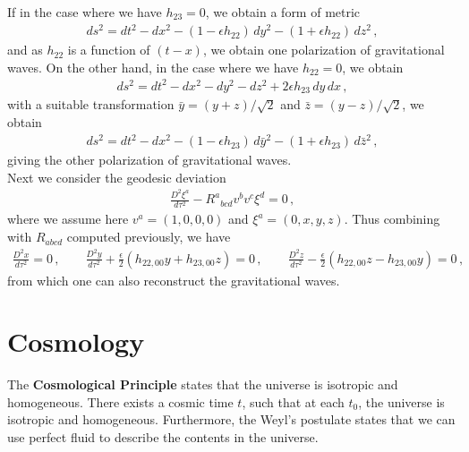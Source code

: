 \documentclass[11pt, onesided]{book}
\theoremstyle{break}
\theoremstyle{break}
\begin{document}
If in the case where we have $h_{23} = 0$, we obtain a form of metric
\begin{align*}
ds^2 = dt^2 - dx^2 - \left(1- \epsilon h_{22}\right)\, dy^2 - (1+\epsilon h_{22})\, dz^2\,,
\end{align*}
and as $h_{22}$ is a function of $(t-x)$, we obtain one polarization of gravitational waves. On the other hand, in the case where we have $h_{22} = 0$, we obtain
\begin{align*}
ds^2 = dt^2 - dx^2 - dy^2 - dz^2 + 2\epsilon h_{23}\, dy\, dx\,,
\end{align*}
with a suitable transformation $\bar{y} = (y+z)/\sqrt{2}$ and $\bar{z} = (y-z) /\sqrt{2}$, we obtain
\begin{align*}
ds^2 = dt^2 - dx^2 - (1-\epsilon h_{23}) \, d\bar{y}^2 - (1+\epsilon  h_{23})\, d\bar{z}^2\,,
\end{align*}
giving the other polarization of gravitational waves. \\

Next we consider the geodesic deviation
\begin{align*}
\frac{D^2 \xi^a}{d\tau^2} -
 R^a{}_{bcd}v^b v^c \xi^d = 0\,, 
\end{align*}
where we assume here $v^a = (1,0,0,0)$ and $\xi^a = (0,x,y,z)$. Thus combining with $R_{abcd}$ computed previously, we have 
\begin{align*}
\frac{D^2 x}{d\tau^2} = 0\,,\qquad
\frac{D^2 y}{d\tau^2} +\frac{\epsilon}{2}\left( h_{22,00}y + h_{23,00}z\right) = 0\,,\qquad
\frac{D^2 z}{d\tau^2} -\frac{\epsilon}{2}\left( h_{22,00}z - h_{23,00}y\right) = 0\,,
\end{align*}
from which one can also reconstruct the gravitational waves.\\

\section[Cosmology]{\color{red}Cosmology\color{black}}
The \textbf{Cosmological Principle} states that the universe is isotropic and homogeneous. There exists a cosmic time $t$, such that at each $t_0$, the universe is isotropic and homogeneous. Furthermore, the Weyl's postulate states that we can use perfect fluid to describe the contents in the universe.\\
\end{document}
